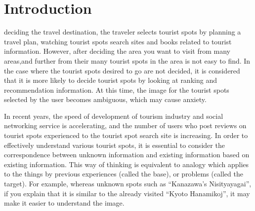 \documentclass[journal]{IAENGtran}
\begin{document}
\section{Introduction}
\label{sec:Introduction}
 deciding the travel destination, the traveler selects tourist spots by planning a travel plan, watching tourist spots search sites and books related to tourist information.
However, after deciding the area you want to visit from many areas,and further from their many tourist spots in the area is not easy to find.
In the case where the tourist spots desired to go are not decided, it is considered that it is more likely to decide tourist spots by looking at ranking and recommendation information.
At this time, the image for the tourist spots selected by the user becomes ambiguous, which may cause anxiety.


In recent years, the speed of development of tourism industry and social networking service is accelerating, and the number of users who post reviews on tourist spots experienced to the tourist spot search site is increasing.
In order to effectively understand various tourist spots, it is essential to consider the correspondence between unknown information and existing information based on existing information.
This way of thinking is equivalent to analogy which applies to the things by previous experiences (called the base), or problems (called the target).
For example, whereas unknown spots such as ``Kanazawa's Nisityayagai'', if you explain that it is similar to the already visited ``Kyoto Hanamikoj'', it may make it easier to understand the image.
\end{document}
